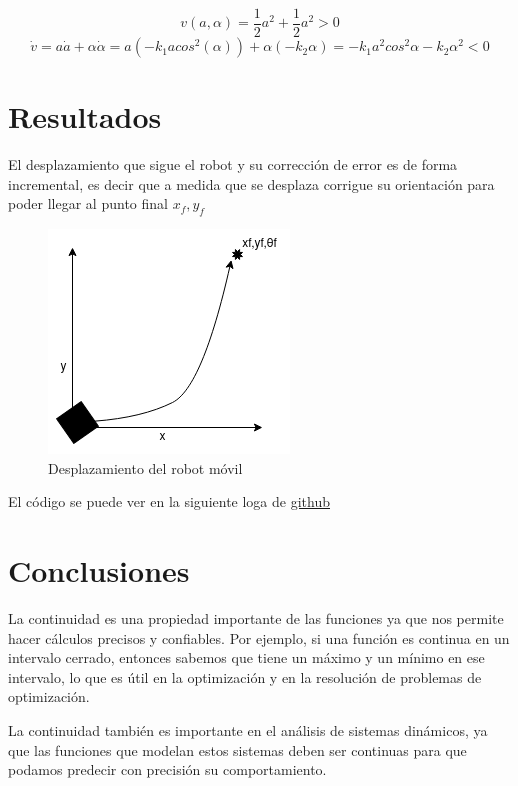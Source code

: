 \documentclass[oneside,onecolumn]{article}
\begin{document}
\[ v(a,\alpha) = \frac{1}{2}a^{2}+\frac{1}{2}a^{2} > 0\]
\[ \dot{v} = a\dot{a} + \alpha\dot{\alpha} = a\left(-k_{1} a cos^{2}(\alpha)\right) + \alpha(-k_{2}\alpha) = -k_{1}a^{2} cos^{2} \alpha - k_{2} \alpha^{2} < 0 \]

\section{Resultados}

El desplazamiento que sigue el robot y su corrección de error es de forma incremental, es decir que a medida que se desplaza corrigue su orientación para poder llegar al punto final $x_f,y_f$

\begin{figure}[h]
  \centering
  \includegraphics[scale=0.7]{graficos/grafico_control_nolineal.png}
  \caption{Desplazamiento del robot móvil}
\end{figure}

El código se puede ver en la siguiente loga de \href{https://github.com/luisballado/MobileRobotics/blob/main/codes/odometro_control.nxc}{github}

\newpage
\section{Conclusiones}

La continuidad es una propiedad importante de las funciones ya que nos permite hacer cálculos precisos y confiables. Por ejemplo, si una función es continua en un intervalo cerrado, entonces sabemos que tiene un máximo y un mínimo en ese intervalo, lo que es útil en la optimización y en la resolución de problemas de optimización.

La continuidad también es importante en el análisis de sistemas dinámicos, ya que las funciones que modelan estos sistemas deben ser continuas para que podamos predecir con precisión su comportamiento.
\end{document}
